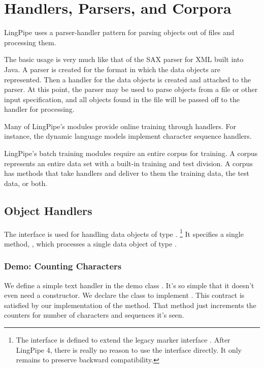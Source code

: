 \chapter{Handlers, Parsers, and Corpora}\label{chapter:corpus}

LingPipe uses a parser-handler pattern for parsing objects out of
files and processing them.  

The basic usage is very much like that of
the SAX parser for XML built into Java.  A parser is created for the
format in which the data objects are represented.  Then a handler for
the data objects is created and attached to the parser.  At this
point, the parser may be used to parse objects from a file or other
input specification, and all objects found in the file will be passed
off to the handler for processing.

Many of LingPipe's modules provide online training through handlers.
For instance, the dynamic language models implement character sequence
handlers.  

LingPipe's batch training modules require an entire corpus for
training.  A corpus represents an entire data set with a built-in
training and test division.  A corpus has methods that take handlers
and deliver to them the training data, the test data, or both.

\section{Object Handlers}

The  interface is used for handling data
objects of type .%
%
\footnote{The  interface is defined to extend the
  legacy marker interface .  After LingPipe 4, there is
  really no reason to use the  interface directly.  It
  only remains to preserve backward compatibility.}
%
It specifies a single method, , which processes a
single data object of type .

\subsection{Demo: Counting Characters}

We define a simple text handler in the demo class
.  It's so simple that it doesn't
even need a constructor.
%
%
We declare the class to implement .
This contract is satisfied by our implementation of the
 method.  That method just increments the
counters for number of characters and sequences it's seen.  

